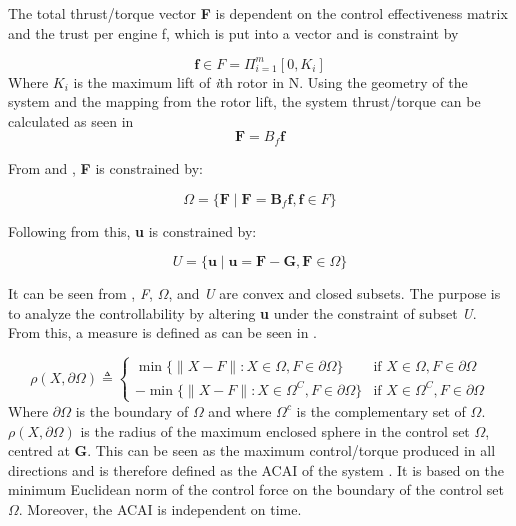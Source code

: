 The total thrust/torque vector \textbf{F}  is dependent on the control effectiveness matrix and the trust per engine f, which is put into a vector and is constraint by 

\begin{equation}
    \label{eq:space_f}
   \textbf{f} \in \textit{F} = \Pi^{m}_{i=1} [0,K_{i}] 
\end{equation}
Where $K_{i}$ is the maximum lift of \textit{i}th rotor in N. Using the geometry of the system and the mapping from the rotor lift, the system thrust/torque can be calculated as seen in 
\begin{equation}
    \label{eq:tot_forcevect}
    \bm{F} = B_f \bm{f}
\end{equation}

From  and , \textbf{F} is constrained by:

\begin{equation}
\label{eq:omegasubset}
\Omega = \{ \textbf{F} \mid \textbf{F} = \textbf{B$_f$}\textbf{f}, \textbf{f} \in \textit{F} \}
\end{equation}

Following from this, \textbf{u} is constrained by: 

\begin{equation}
    \label{eq:usubset}
    U = \{ \mathbf{u} \mid \mathbf{u} = \mathbf{F} - \mathbf{G}, \mathbf{F} \in \Omega \} 
\end{equation}

It can be seen from , \textit{F}, $\Omega$, and \textit{U} are convex and closed subsets. The purpose is to analyze the controllability by altering \textbf{u} under the constraint of subset \textit{U}. From this, a measure is defined as can be seen in .

\begin{equation}
\label{eq:ACAI_measure}
\rho(X, \partial \Omega) \triangleq 
\begin{cases}
    \min \{ \|X - F\| : X \in \Omega, F \in \partial \Omega \} & \text{if } X \in \Omega, F \in \partial \Omega \\
    -\min \{ \|X - F\| : X \in \Omega^C, F \in \partial \Omega \} & \text{if } X \in \Omega^C, F \in \partial \Omega
\end{cases}
\end{equation}
Where $\partial \Omega$ is the boundary of $\Omega$ and where $\Omega^c$ is the complementary set of $\Omega$. $\rho(X, \partial \Omega) $ is the radius of the maximum enclosed sphere in the control set $\Omega$, centred at \textbf{G}. This can be seen as the maximum control/torque produced in all directions and is therefore defined as the ACAI of the system \cite{du2015controllability}. It is based on the minimum Euclidean norm of the control force on the boundary of the control set $\Omega$. Moreover, the ACAI is independent on time.

